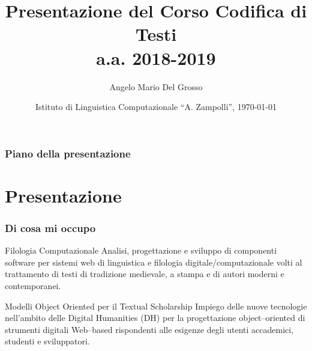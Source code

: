 \documentclass{beamer}
\title{Presentazione del Corso Codifica di Testi \\a.a. 2018-2019}
\author[A.M. Del Grosso]{Angelo Mario Del Grosso}
\institute{\texttt{angelo.delgrosso@ilc.cnr.it} \\\bigskip\textit{CNR-ILC-LicoLab}}
\date{Istituto di Linguistica Computazionale ``A. Zampolli'', \today}
\begin{document}
\begin{frame}
	\maketitle
\end{frame}

\begin{frame}
	\frametitle{Piano della presentazione}
	\tableofcontents
\end{frame}

\section{Presentazione}

\begin{frame}
	\frametitle{Di cosa mi occupo}
	\addtocounter{nframe}{1}

	\begin{block}{Filologia Computazionale}
		Analisi, progettazione e sviluppo di componenti software per sistemi web di linguistica e filologia digitale/computazionale volti al trattamento di testi di tradizione medievale, a stampa e di autori moderni e contemporanei.
	\end{block}

	\begin{block}{Modelli Object Oriented per il Textual Scholarship}
		Impiego delle nuove tecnologie nell’ambito delle Digital Humanities (DH) per la progettazione
		object–oriented di strumenti digitali Web–based rispondenti alle esigenze degli utenti accademici, studenti e sviluppatori.
	\end{block}




\end{frame}
\end{document}
